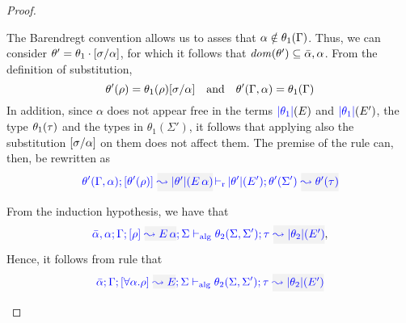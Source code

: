 \begin{proof}
\begin{description}
The Barendregt convention allows us to asses that $\alpha\notin\theta_1(\Gamma)$. Thus, we can
consider $\theta'=\theta_1\cdot[\sigma/\alpha]$, for which it follows that
${\it dom }{(\theta')}\subseteq\bar\alpha,\alpha$. From the definition of substitution,
\begin{equation*}
  \theta'(\rho) = \theta_1(\rho)[\sigma/\alpha]\quad\text{and}\quad
  \theta'(\Gamma,\alpha) = \theta_1(\Gamma)
\end{equation*}
In addition, since $\alpha$ does not appear free in the terms ${\color{blue} |\theta_1|}(E)$ and
${\color{blue} |\theta_1|}(E')$, the type $\theta_1(\tau)$ and the types in $\theta_1(\Sigma')$,
it follows that applying also the substitution $[\sigma/\alpha]$ on them does not affect them.
The premise of the rule can, then, be rewritten as
\begin{equation*}
  \dmres{\theta'(\tenv,\alpha)}{\theta'(\rulet)}{\etrans{\theta'}(\mmapp{E}{\alpha})}{\theta'(\Sigma')}{\theta'(\type)}{\etrans{\theta'}(E')}
\end{equation*}
  
From the induction hypothesis, we have that
\begin{equation*}
  \admres{\bar\alpha,\alpha}{\tenv}{\rulet}{\mmapp{E}{\alpha}}{\Sigma}{\type}{\etrans{\theta_2}(E')}{\theta_2(\Sigma,\Sigma')}
,\end{equation*}
Hence, it follows from rule  that
\begin{equation*}
\admres{\bar\alpha}{\tenv}{\tall{\alpha}{\rulet}}{E}{\Sigma}{\type}{\etrans{\theta_2}(E')}{\theta_2(\Sigma,\Sigma')}
\end{equation*}


\end{description}
\end{proof}

